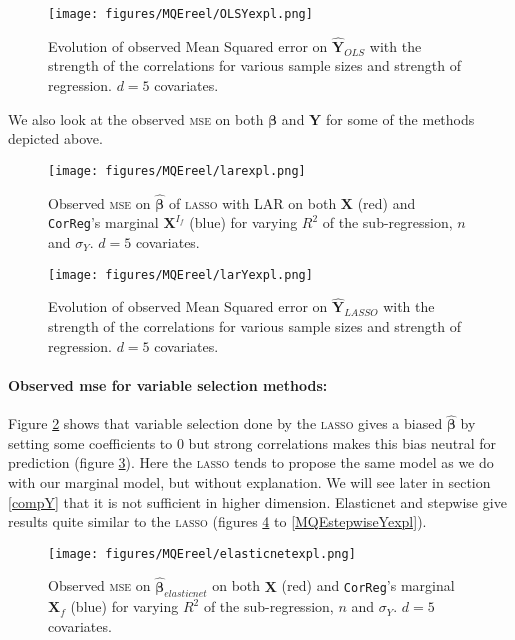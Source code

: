 \documentclass[12pt,a4paper]{report}
\begin{document}
	 \begin{figure}
	 \centering
	  \texttt{[image: figures/MQEreel/OLSYexpl.png]}
	  \caption{Evolution of observed Mean Squared error on $\hat{\boldsymbol{Y}}_{OLS}$ with the strength of the correlations for various sample sizes and strength of regression. $d=5$ covariates. } \label{MQEOLSYexpl}
	\end{figure}

	
	We also look at the observed \textsc{mse} on both $\boldsymbol{\beta}$ and $\boldsymbol{Y}$ for some of the methods depicted above.
	
 \begin{figure}[h!]
	\texttt{[image: figures/MQEreel/larexpl.png]}
	\caption{Observed \textsc{mse} on $\hat{\boldsymbol{\beta}}$ of \textsc{lasso} with LAR on both $\boldsymbol{X}$ (red) and {\tt CorReg}'s marginal $\boldsymbol{X}^{I_f}$ (blue) for varying $R^2$ of the sub-regression, $n$ and $\sigma_Y$. $d=5$ covariates.}\label{MSElarexpl}
\end{figure} 
	
	 \begin{figure}
	 \centering
	  \texttt{[image: figures/MQEreel/larYexpl.png]}
	  \caption{Evolution of observed Mean Squared error on $\hat{\boldsymbol{Y}}_{LASSO}$ with the strength of the correlations for various sample sizes and strength of regression. $d=5$ covariates. } \label{MQElarYexpl}
	\end{figure}
	
		\paragraph{Observed {\sc mse} for variable selection methods:}
	Figure \ref{MSElarexpl} shows that variable selection done by the \textsc{lasso} gives a biased $\hat{\boldsymbol{\beta}}$ by setting some coefficients to 0 but strong correlations makes this bias neutral for prediction (figure \ref{MQElarYexpl}). Here the \textsc{lasso} tends to propose the same model as we do  with our marginal model, but without explanation. We will see  later in section \ref{compY} that it is not sufficient in higher dimension. Elasticnet and stepwise give results quite similar to the \textsc{lasso} (figures \ref{MSEelasticnetexpl} to \ref{MQEstepwiseYexpl}). \\

	\begin{figure}[h!]
	\texttt{[image: figures/MQEreel/elasticnetexpl.png]}
	\caption{Observed \textsc{mse} on $\hat{\boldsymbol{\beta}}_{elasticnet}$ on both $\boldsymbol{X}$ (red) and {\tt CorReg}'s marginal $\boldsymbol{X}_f$ (blue) for varying $R^2$ of the sub-regression, $n$ and $\sigma_Y$. $d=5$ covariates.}\label{MSEelasticnetexpl}
\end{figure} 
	
\end{document}
